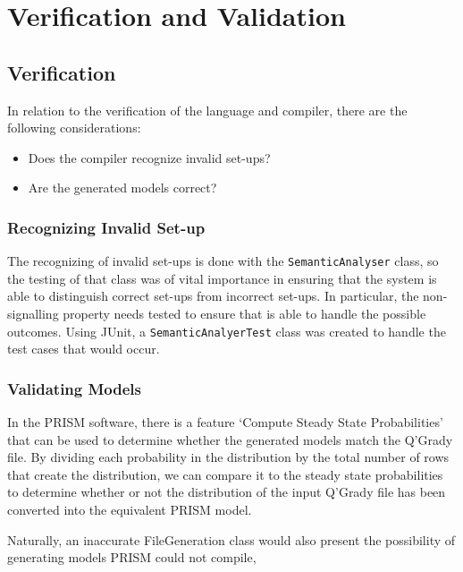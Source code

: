 \documentclass[report.tex]{subfiles}
\begin{document}
\chapter{Verification and Validation} %
\label{cha:verification_and_validation}
\section{Verification} %
\label{sec:verification}
In relation to the verification of the language and compiler, there are the
following considerations:
\begin{itemize}
    \item Does the compiler recognize invalid set-ups?
    \item Are the generated models correct?
\end{itemize}

\subsection{Recognizing Invalid Set-up} %
\label{sub:recognizing_invalid_set_up}
The recognizing of invalid set-ups is done with the \texttt{SemanticAnalyser}
class, so the testing of that class was of vital importance in ensuring that
the system is able to distinguish correct set-ups from incorrect set-ups. In
particular, the non-signalling property needs tested to ensure that is able to
handle the possible outcomes. Using JUnit, a \texttt{SemanticAnalyerTest} class
was created to handle the test cases that would occur.


\subsection{Validating Models} %
\label{sub:validating_models}
In the PRISM software, there is a feature `Compute Steady State Probabilities'
that can be used to determine whether the generated models match the Q'Grady
file. By dividing each probability in the distribution by the total number of
rows that create the distribution, we can compare it to the steady state
probabilities to determine whether or not the distribution of the input Q'Grady
file has been converted into the equivalent PRISM model.

Naturally, an inaccurate FileGeneration class would also present the
possibility of generating models PRISM could not compile, 
\end{document}
